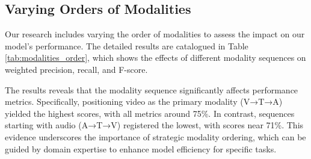 \documentclass{article} %
\begin{document}


\FloatBarrier
\subsection{Varying Orders of Modalities}
\label{apsec:Orders}

Our research includes varying the order of modalities to assess the impact on our model's performance. The detailed results are catalogued in Table \ref{tab:modalities_order}, which shows the effects of different modality sequences on weighted precision, recall, and F-score.

The results reveals that the modality sequence significantly affects performance metrics. Specifically, positioning video as the primary modality (V→T→A) yielded the highest scores, with all metrics around 75\%. In contrast, sequences starting with audio (A→T→V) registered the lowest, with scores near 71\%. This evidence underscores the importance of strategic modality ordering, which can be guided by domain expertise to enhance model efficiency for specific tasks.




\FloatBarrier





% 

% 
\end{document}
